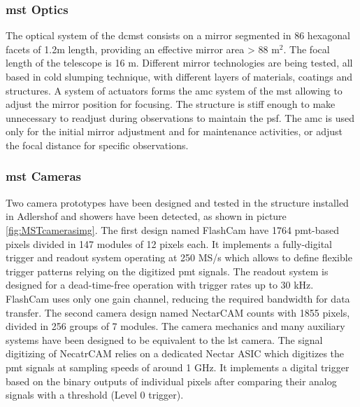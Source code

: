\documentclass[main.tex]{subfiles}
\begin{document}
\subsubsection{\gls{mst} Optics}

The optical system of the \gls{dcmst} consists on a mirror segmented in 86 hexagonal facets of 1.2m length, providing an effective mirror area > 88 m$^2$. The focal length of the telescope is 16 m.
Different mirror technologies are being tested, all based in cold slumping technique, with different layers of materials, coatings and structures. A system of actuators forms the \gls{amc} system of the \gls{mst} allowing to adjust the mirror position for focusing. The structure is stiff enough to make unnecessary to readjust during observations to maintain the \gls{psf}. The \gls{amc} is used only for the initial mirror adjustment and for maintenance activities, or adjust the focal distance for specific observations.

\subsubsection{\gls{mst} Cameras}

Two camera prototypes have been designed and tested in the structure installed in Adlershof and showers have been detected, as shown in picture \ref{fig:MSTcamerasimg}.
The first design named FlashCam have 1764 \gls{pmt}-based pixels divided in 147 modules of 12 pixels each. It implements a fully-digital trigger and readout system operating at 250 MS/s which allows to define flexible trigger patterns relying on the digitized \gls{pmt} signals. The readout system is designed for a dead-time-free operation with trigger rates up to 30 kHz. FlashCam uses only one gain channel, reducing the required bandwidth for data transfer. 
The second camera design named NectarCAM counts with 1855 pixels, divided in 256 groups of 7 modules. The camera mechanics and many auxiliary systems have been designed to be equivalent to the \gls{lst} camera. The signal digitizing of NecatrCAM relies on a dedicated Nectar ASIC which digitizes the \gls{pmt} signals at sampling speeds of around 1 GHz. It implements a digital trigger based on the binary outputs of individual pixels after comparing their analog signals with a threshold (Level 0 trigger).\\
\end{document}

